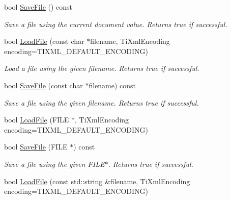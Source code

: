 \begin{DoxyCompactItemize}
\item 
\hypertarget{class_ti_xml_document_ab63b96a6af5a467e289c7c75202edad9}{}\label{class_ti_xml_document_ab63b96a6af5a467e289c7c75202edad9} 
bool \hyperlink{class_ti_xml_document_ab63b96a6af5a467e289c7c75202edad9}{Save\+File} () const
\begin{DoxyCompactList}\small\item\em Save a file using the current document value. Returns true if successful. \end{DoxyCompactList}\item 
\hypertarget{class_ti_xml_document_a879cdf5e981b8b2d2ef82f2546dd28fb}{}\label{class_ti_xml_document_a879cdf5e981b8b2d2ef82f2546dd28fb} 
bool \hyperlink{class_ti_xml_document_a879cdf5e981b8b2d2ef82f2546dd28fb}{Load\+File} (const char $\ast$filename, Ti\+Xml\+Encoding encoding=T\+I\+X\+M\+L\+\_\+\+D\+E\+F\+A\+U\+L\+T\+\_\+\+E\+N\+C\+O\+D\+I\+NG)
\begin{DoxyCompactList}\small\item\em Load a file using the given filename. Returns true if successful. \end{DoxyCompactList}\item 
\hypertarget{class_ti_xml_document_ae641f33784381017c44e107cc2c86b5c}{}\label{class_ti_xml_document_ae641f33784381017c44e107cc2c86b5c} 
bool \hyperlink{class_ti_xml_document_ae641f33784381017c44e107cc2c86b5c}{Save\+File} (const char $\ast$filename) const
\begin{DoxyCompactList}\small\item\em Save a file using the given filename. Returns true if successful. \end{DoxyCompactList}\item 
bool \hyperlink{class_ti_xml_document_a41f6fe7200864d1dca663d230caf8db6}{Load\+File} (F\+I\+LE $\ast$, Ti\+Xml\+Encoding encoding=T\+I\+X\+M\+L\+\_\+\+D\+E\+F\+A\+U\+L\+T\+\_\+\+E\+N\+C\+O\+D\+I\+NG)
\item 
\hypertarget{class_ti_xml_document_a8f5a1022168a5767e32becec7b6f44ee}{}\label{class_ti_xml_document_a8f5a1022168a5767e32becec7b6f44ee} 
bool \hyperlink{class_ti_xml_document_a8f5a1022168a5767e32becec7b6f44ee}{Save\+File} (F\+I\+LE $\ast$) const
\begin{DoxyCompactList}\small\item\em Save a file using the given F\+I\+L\+E$\ast$. Returns true if successful. \end{DoxyCompactList}\item 
bool \hyperlink{class_ti_xml_document_a18ae6ed34fed7991ebc220862dfac884}{Load\+File} (const std\+::string \&filename, Ti\+Xml\+Encoding encoding=T\+I\+X\+M\+L\+\_\+\+D\+E\+F\+A\+U\+L\+T\+\_\+\+E\+N\+C\+O\+D\+I\+NG)

\end{DoxyCompactItemize}
